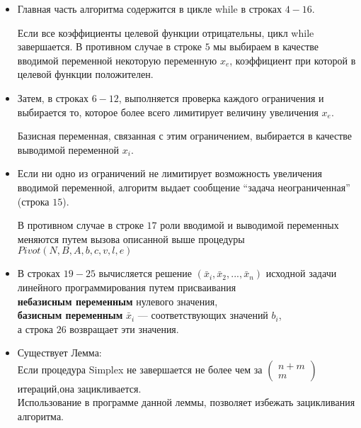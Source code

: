 \documentclass[../body.tex]{subfiles}
\begin{document}
\begin{itemize}
\begin{algorithm}[H]
{	 	}{return “задача неразрешима”}
	 	
	 	\caption{Поиск начального базисного допустимого решения
	 		задачи линейного программирования $L$, заданной в стандартной форме}
	 	
	 \end{algorithm}
	
	\item Главная часть алгоритма содержится в цикле while в строках $4-16$. 
	
	Если все коэффициенты целевой функции отрицательны, цикл while завершается. В противном случае в строке $5$ мы выбираем в качестве вводимой переменной некоторую переменную $x_{e}$, коэффициент при которой в целевой функции положителен.
	\item  Затем, в строках $6-12$, выполняется проверка каждого ограничения и выбирается то,
	которое более всего лимитирует величину увеличения  $x_{e}$. 
	
	Базисная переменная, связанная с этим
	ограничением, выбирается в качестве выводимой переменной  $x_{i}$.
	\item 
	Если ни одно из ограничений не лимитирует возможность увеличения вводимой переменной, алгоритм выдает сообщение “задача неограниченная” (строка $15$). 
	
	В противном случае в строке $17$ роли вводимой и выводимой переменных
	меняются путем вызова описанной выше процедуры  $Pivot(N,B,A,b,c,v, l, e)$
	\item 
	В строках $19-25$ вычисляется решение $(\bar{x}_{i}, \bar{x}_{2}, ... , \bar{x}_{n})$ исходной задачи линейного
	программирования путем присваивания \\ \textbf{небазисным переменным} нулевого
	значения, \\\textbf{базисным переменным}  $\bar{x}_{i}$ — соответствующих значений $b_{i}$,\\ а строка $26$ возвращает эти значения.
	\item Существует Лемма:\\ Если процедура Simplex не завершается не более чем за $\left(\begin{array}{c}n+m\\ m\end{array}\right)$ итераций,она зацикливается. \\ 
	
	Использование в программе данной леммы, позволяет избежать зацикливания алгоритма.
	
\end{itemize}
\end{document}
